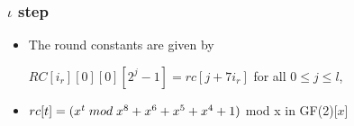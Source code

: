 \documentclass{beamer}
\begin{document}



\begin{frame}
\frametitle{$\iota$ step}
\begin{itemize}
\item The round constants are given by
\begin{center}$RC[i_{r}][0][0][2^{j} - 1] = rc[j + 7i_{r}]$ for all $ 0 \leq j \leq l$,\end{center}
\item $rc[t] = (x^{t} \thickspace mod \thickspace x^{8} + x^{6} + x^{5} + x^{4} + 1)$ mod x in GF(2)[$x$]
\end{itemize}
\end{frame}
\end{document}

